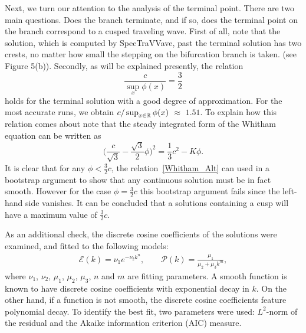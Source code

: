 Next, we turn our attention to the analysis of the terminal point. There
are two main questions. Does the branch terminate, and if so, 
does the terminal point on the branch correspond to a cusped traveling wave.
First of all, note that the solution, which is computed by \textsf{SpecTraVVave}, 
past the terminal solution has two crests, no matter how small the 
stepping on the bifurcation branch is taken.
(see Figure 5(b)).   
Secondly, as will be explained presently, the relation 
\begin{equation*}
\frac{c}{\sup_{x} \phi(x)} = \frac{3}{2} 
\end{equation*}
holds for the terminal solution with a good degree of approximation.
For the most accurate runs, we obtain $c / \sup_{x \in \mathbb{R}} \phi(x)$ $\approx$ $1.51$. 
%
To explain how this relation comes about note that the steady integrated form of the
Whitham equation can be written as
\begin{equation}\label{Whitham_Alt}
\Big( \frac{c}{\sqrt{3}} - \frac{\sqrt{3}}{2}\phi \Big)^{2}  = \frac{1}{3} c^2 - K \phi.
\end{equation}
It is clear that for any $\phi < \frac{3}{2} c$, the relation~\eqref{Whitham_Alt}
can used in a bootstrap argument to show that any continuous solution must be
in fact smooth. However for the case $\phi =  \frac{3}{2} c$ this bootstrap
argument fails since the left-hand side vanishes. It can be concluded that
a solutions containing a cusp will have a maximum  value of $\frac{3}{2} c$.


	
As an additional check, the discrete cosine coefficients of the solutions were
examined, and fitted to the following models:
\begin{align*}
	\mathcal{E}(k) = \nu_1 e^{-\nu_2 k^n}, \qquad 
	\mathcal{P}(k) = \frac{\mu_1}{\mu_2 + \mu_3 k^m},
\end{align*}
%
where $\nu_1$, $\nu_2$, $\mu_1$, $\mu_2$, $\mu_3$, $n$ and $m$ are fitting parameters. 
A smooth function is known to have discrete cosine coefficients with exponential decay in $k$. 
On the other hand, if a function is not smooth, the discrete cosine coefficients feature polynomial decay. 
To identify the best fit, two parameters were used: $L^2$-norm of the residual 
and the Akaike information criterion (AIC) measure. 

